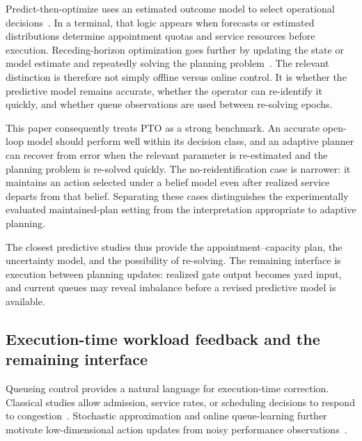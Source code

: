 \documentclass[preprint,12pt,authoryear,a4paper]{elsarticle}
\begin{document}
Predict-then-optimize uses an estimated outcome model to select operational decisions~\citep{BertsimasKallus2020PrescriptiveAnalytics,ElmachtoubGrigas2022SmartPTO}. In a terminal, that logic appears when forecasts or estimated distributions determine appointment quotas and service resources before execution. Receding-horizon optimization goes further by updating the state or model estimate and repeatedly solving the planning problem~\citep{MayneRawlingsRaoScokaert2000MPC,RawlingsMayneDiehl2017MPC}. The relevant distinction is therefore not simply offline versus online control. It is whether the predictive model remains accurate, whether the operator can re-identify it quickly, and whether queue observations are used between re-solving epochs.

This paper consequently treats PTO as a strong benchmark. An accurate open-loop model should perform well within its decision class, and an adaptive planner can recover from error when the relevant parameter is re-estimated and the planning problem is re-solved quickly. The no-reidentification case is narrower: it maintains an action selected under a belief model even after realized service departs from that belief. Separating these cases distinguishes the experimentally evaluated maintained-plan setting from the interpretation appropriate to adaptive planning.

The closest predictive studies thus provide the appointment--capacity plan, the uncertainty model, and the possibility of re-solving. The remaining interface is execution between planning updates: realized gate output becomes yard input, and current queues may reveal imbalance before a revised predictive model is available.

\subsection{Execution-time workload feedback and the remaining interface}

Queueing control provides a natural language for execution-time correction. Classical studies allow admission, service rates, or scheduling decisions to respond to congestion~\citep{StidhamWeber1989QueueControl,Wein1990ControllableInputs,GeorgeHarrison2001AdjustableService,Neely2010StochasticNetwork}. Stochastic approximation and online queue-learning further motivate low-dimensional action updates from noisy performance observations~\citep{RobbinsMonro1951StochasticApproximation,KushnerYin2003StochasticApproximation,Borkar2008StochasticApproximation,ChenHongLiu2026QueueLearning,CohenSubramanianZhang2024Admission}.
\end{document}
